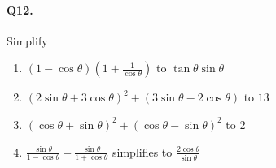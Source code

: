 \documentclass{article}
\begin{document}
\paragraph{Q12.}
Simplify

\begin{enumerate}[label=(\alph*)]
  \item $(1-\cos\theta)\left( 1+ \frac{1}{\cos\theta} \right)$ to $\tan\theta \sin\theta$
    \item $(2\sin\theta + 3\cos\theta)^{2} + (3\sin\theta - 2\cos\theta)$ to $13$
    \item $(\cos\theta + \sin\theta)^{2} + (\cos\theta - \sin\theta)^{2}$ to $2$
  \item $\frac{\sin\theta}{1-\cos\theta} - \frac{\sin\theta}{1+\cos\theta}$ simplifies to $\frac{2\cos\theta}{\sin\theta}$
\end{enumerate}
\end{document}
